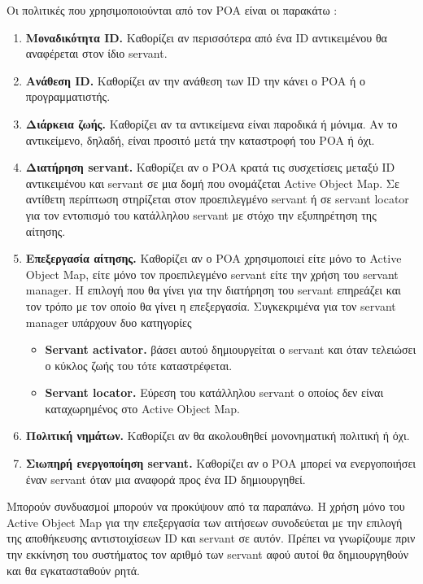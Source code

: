 Οι πολιτικές που χρησιμοποιούνται από τον POA είναι οι παρακάτω 
\citep{CorbaProg2001}:

\begin{enumerate}
\item \textbf{Μοναδικότητα ID.} Καθορίζει αν περισσότερα από ένα ID 
αντικειμένου θα αναφέρεται στον ίδιο servant.
\item \textbf{Ανάθεση ID.} Καθορίζει αν την ανάθεση των ID την κάνει ο 
POA ή ο προγραμματιστής.
\item \textbf{Διάρκεια ζωής.} Καθορίζει αν τα αντικείμενα είναι 
παροδικά ή μόνιμα. Αν το αντικείμενο, δηλαδή, είναι προσιτό μετά την 
καταστροφή του POA ή όχι.
\item \textbf{Διατήρηση servant.} Καθορίζει αν ο POA κρατά τις 
συσχετίσεις μεταξύ ID αντικειμένου και servant σε μια δομή που 
ονομάζεται Active Object Map. Σε αντίθετη περίπτωση στηρίζεται στον 
προεπιλεγμένο servant ή σε servant locator για τον εντοπισμό του 
κατάλληλου servant με στόχο την εξυπηρέτηση της αίτησης.
\item \textbf{Επεξεργασία αίτησης.} Καθορίζει αν ο POA χρησιμοποιεί 
είτε μόνο το Active Object Map, είτε μόνο τον προεπιλεγμένο servant είτε 
την χρήση του servant manager. Η επιλογή που θα γίνει για την διατήρηση 
του servant επηρεάζει και τον τρόπο με τον οποίο θα γίνει η επεξεργασία. 
Συγκεκριμένα για τον servant manager υπάρχουν δυο κατηγορίες
\begin{itemize}
\item \textbf{Servant activator.} βάσει αυτού δημιουργείται ο servant 
και όταν τελειώσει ο κύκλος ζωής του τότε καταστρέφεται.
\item \textbf{Servant locator.} Εύρεση του κατάλληλου servant ο οποίος 
δεν είναι καταχωρημένος στο Active Object Map.
\end{itemize}
\item \textbf{Πολιτική νημάτων.} Καθορίζει αν θα ακολουθηθεί 
μονονηματική πολιτική ή όχι.
\item \textbf{Σιωπηρή ενεργοποίηση servant.} Καθορίζει αν ο POA μπορεί 
να ενεργοποιήσει έναν servant όταν μια αναφορά προς ένα ID δημιουργηθεί.
\setcounter{numberedCntBC}{\theenumi}
\end{enumerate}
Μπορούν συνδυασμοί μπορούν να προκύψουν από τα παραπάνω. Η χρήση μόνο 
του Active Object Map για την επεξεργασία των αιτήσεων συνοδεύεται με 
την επιλογή της αποθήκευσης αντιστοιχίσεων ID και servant σε αυτόν. 
Πρέπει να γνωρίζουμε πριν την εκκίνηση του συστήματος τον αριθμό των 
servant αφού αυτοί θα δημιουργηθούν και θα εγκατασταθούν ρητά.

